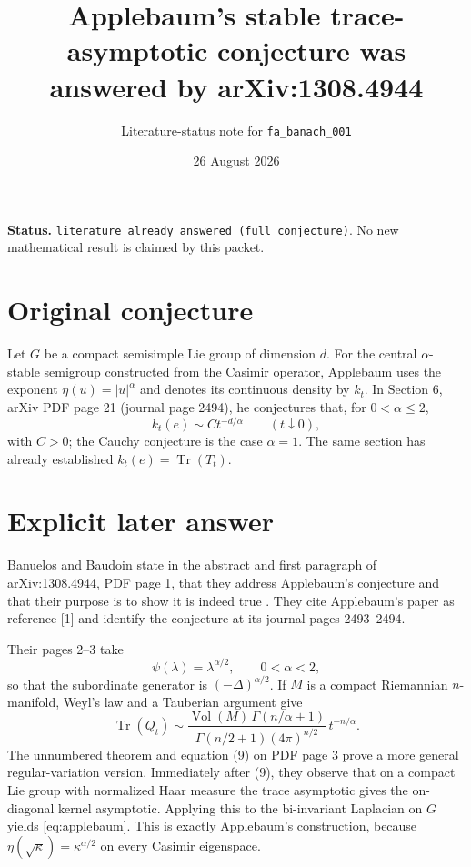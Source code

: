 \documentclass[11pt]{article}
\title{Applebaum's stable trace-asymptotic conjecture was answered by arXiv:1308.4944}
\author{Literature-status note for \texttt{fa\_banach\_001}}
\date{26 August 2026}
\begin{document}
\maketitle

\noindent\textbf{Status.}
\texttt{literature\_already\_answered (full conjecture)}.  No new
mathematical result is claimed by this packet.

\section*{Original conjecture}

Let $G$ be a compact semisimple Lie group of dimension $d$.  For the central
$\alpha$-stable semigroup constructed from the Casimir operator, Applebaum
uses the exponent $\eta(u)=|u|^\alpha$ and denotes its continuous density by
$k_t$.  In Section 6, arXiv PDF page 21 (journal page 2494), he conjectures
that, for $0<\alpha\leq 2$,
\begin{equation}\label{eq:applebaum}
  k_t(e)\sim C t^{-d/\alpha}\qquad(t\downarrow0),
\end{equation}
with $C>0$; the Cauchy conjecture is the case $\alpha=1$.  The same section
has already established $k_t(e)=\operatorname{Tr}(T_t)$.

\section*{Explicit later answer}

Banuelos and Baudoin state in the abstract and first paragraph of
arXiv:1308.4944, PDF page 1, that they address Applebaum's conjecture and that
their purpose is to show it is indeed true \cite{BB2013}.  They cite
Applebaum's paper as reference [1] and identify the conjecture at its journal
pages 2493--2494.

Their pages 2--3 take
\[
  \psi(\lambda)=\lambda^{\alpha/2},\qquad 0<\alpha<2,
\]
so that the subordinate generator is $(-\Delta)^{\alpha/2}$.  If $M$ is a
compact Riemannian $n$-manifold, Weyl's law and a Tauberian argument give
\begin{equation}\label{eq:bb-stable}
 \operatorname{Tr}(Q_t)
 \sim
 \frac{\operatorname{Vol}(M)\,\Gamma(n/\alpha+1)}
      {\Gamma(n/2+1)(4\pi)^{n/2}}\,t^{-n/\alpha}.
\end{equation}
The unnumbered theorem and equation (9) on PDF page 3 prove a more general
regular-variation version.  Immediately after (9), they observe that on a
compact Lie group with normalized Haar measure the trace asymptotic gives the
on-diagonal kernel asymptotic.  Applying this to the bi-invariant Laplacian on
$G$ yields \eqref{eq:applebaum}.  This is exactly Applebaum's construction,
because $\eta(\sqrt{\kappa})=\kappa^{\alpha/2}$ on every Casimir eigenspace.
\end{document}
